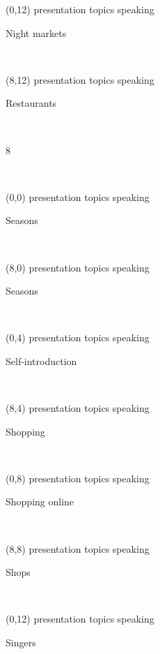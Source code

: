 \documentclass[a4paper]{article}
\newcommand{\mycard}[5]{%
	\small #1 #2
	\par
	\parbox[t][6.7cm][c]{9.5cm}{%
	\hspace{0.1cm} \Large#3\\
	\normalsize#4 #5
	}
}
\begin{document}
\begin{textblock}{8}(0,12)
\mycard{presentation topics}{speaking}{\parbox{9.0cm}{
\centering Night markets
}}{}{} 
\end{textblock}

\begin{textblock}{8}(8,12)
\mycard{presentation topics}{speaking}{\parbox{9.0cm}{
\centering Restaurants 
}}{}{} 
\end{textblock}

\begin{tiny}8\end{tiny}\\
\newpage

\begin{textblock}{8}(0,0)
\mycard{presentation topics}{speaking}{\parbox{9.0cm}{
\centering Seasons       
}}{}{} 
\end{textblock}

\begin{textblock}{8}(8,0)
\mycard{presentation topics}{speaking}{\parbox{9.0cm}{
\centering Seasons         
}}{}{} 
\end{textblock}

\begin{textblock}{8}(0,4)
\mycard{presentation topics}{speaking}{\parbox{9.0cm}{
\centering Self-introduction 
}}{}{} 
\end{textblock}

\begin{textblock}{8}(8,4)
\mycard{presentation topics}{speaking}{\parbox{9.0cm}{
\centering Shopping   
}}{}{} 
\end{textblock}

\begin{textblock}{8}(0,8)
\mycard{presentation topics}{speaking}{\parbox{9.0cm}{
\centering Shopping online 
}}{}{} 
\end{textblock}

\begin{textblock}{8}(8,8)
\mycard{presentation topics}{speaking}{\parbox{9.0cm}{
\centering Shops       
}}{}{} 
\end{textblock}

\begin{textblock}{8}(0,12)
\mycard{presentation topics}{speaking}{\parbox{9.0cm}{
\centering Singers     
}}{}{} 
\end{textblock}
\end{document}
